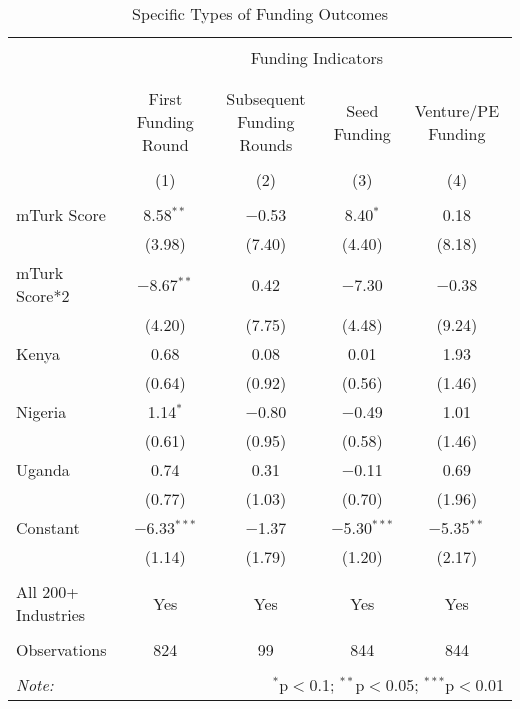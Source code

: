 \documentclass[12pt]{article}
\begin{document}
\begin{table}[!htbp] \centering 
  \caption{Specific Types of Funding Outcomes} 
  \label{} 
\footnotesize 
\begin{tabular}{@{\extracolsep{5pt}}lcccc} 
\\[-1.8ex]\hline 
\hline \\[-1.8ex] 
 & \multicolumn{4}{c}{Funding Indicators} \\ 
\cline{2-5} 
\\[-1.8ex] &  &  &  &  \\ 
 & First Funding Round & Subsequent Funding Rounds & Seed Funding & Venture/PE Funding \\ 
\\[-1.8ex] & (1) & (2) & (3) & (4)\\ 
\hline \\[-1.8ex] 
 mTurk Score & 8.58$^{**}$ & $-$0.53 & 8.40$^{*}$ & 0.18 \\ 
  & (3.98) & (7.40) & (4.40) & (8.18) \\ 
  mTurk Score*2 & $-$8.67$^{**}$ & 0.42 & $-$7.30 & $-$0.38 \\ 
  & (4.20) & (7.75) & (4.48) & (9.24) \\ 
  Kenya & 0.68 & 0.08 & 0.01 & 1.93 \\ 
  & (0.64) & (0.92) & (0.56) & (1.46) \\ 
  Nigeria & 1.14$^{*}$ & $-$0.80 & $-$0.49 & 1.01 \\ 
  & (0.61) & (0.95) & (0.58) & (1.46) \\ 
  Uganda & 0.74 & 0.31 & $-$0.11 & 0.69 \\ 
  & (0.77) & (1.03) & (0.70) & (1.96) \\ 
  Constant & $-$6.33$^{***}$ & $-$1.37 & $-$5.30$^{***}$ & $-$5.35$^{**}$ \\ 
  & (1.14) & (1.79) & (1.20) & (2.17) \\ 
\hline \\[-1.8ex] 
 All 200+ Industries & Yes & Yes & Yes & Yes \\ 
 \hline \\[-1.8ex] 
Observations & 824 & 99 & 844 & 844 \\ 
\hline 
\hline \\[-1.8ex] 
\textit{Note:}  & \multicolumn{4}{r}{$^{*}$p$<$0.1; $^{**}$p$<$0.05; $^{***}$p$<$0.01} \\ 
\end{tabular} 
\end{table} 
\end{document}
